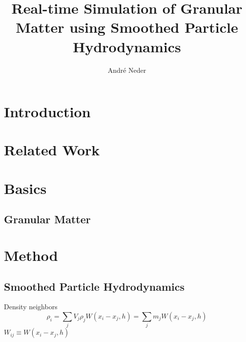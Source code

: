 \documentclass[intern]{cgMA}
\title{Real-time Simulation of Granular Matter using Smoothed Particle Hydrodynamics}
\author{André Neder}
\begin{document}
    \maketitle
    \newpage
    \tableofcontents
    \newpage
    \section{Introduction}
    
    \section{Related Work}
    
    \section{Basics}
    \subsection{Granular Matter}
    
    \section{Method}
    \subsection{Smoothed Particle Hydrodynamics}
    Density neighbors
    \begin{equation}
        \rho_i = \sum_j V_j \rho_j W(x_i - x_j, h)
        = \sum_j m_j W(x_i - x_j, h)
    \end{equation}
    $ W_{ij} \equiv W(x_i - x_j, h)$\\
    
\end{document}
